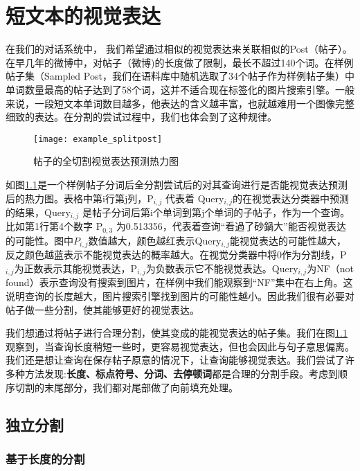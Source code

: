 \chapter{短文本的视觉表达}

在我们的对话系统中，\cite{goldberg2014word2vec} 我们希望通过相似的视觉表达来关联相似的Post（帖子）。在早几年的微博中，对帖子（微博)的长度做了限制，最长不超过140个词。在样例帖子集（Sampled Post，我们在语料库中随机选取了34个帖子作为样例帖子集）中单词数量最高的帖子达到了58个词，这并不适合现在标签化的图片搜索引擎。一般来说，一段短文本单词数目越多，他表达的含义越丰富，也就越难用一个图像完整细致的表达。在分割的尝试过程中，我们也体会到了这种规律。

\begin{figure}[ht]
\centering
\texttt{[image: example\_splitpost]}
\caption{帖子的全切割视觉表达预测热力图} \label{fig:example_splitpost}
\end{figure}

如图\ref{fig:example_splitpost}是一个样例帖子分词后全分割尝试后的对其查询进行是否能视觉表达预测后的热力图。表格中第i行第j列，P$_{i,j}$ 代表着 Query$_{i,j}$的在视觉表达分类器中预测的结果，Query$_{i,j}$ 是帖子分词后第i个单词到第j个单词的子帖子，作为一个查询。比如第1行第4个数字 P$_{0,3}$ 为0.513356，代表着查询“看過了砂鍋大”能否视觉表达的可能性。图中$P_{i,j}$数值越大，颜色越红表示Query$_{i,j}$能视觉表达的可能性越大，反之颜色越蓝表示不能视觉表达的概率越大。在视觉分类器中将0作为分割线，P$_{i,j}$为正数表示其能视觉表达，P$_{i,j}$为负数表示它不能视觉表达。Query$_{i,j}$为NF（not found）表示查询没有搜索到图片，在样例中我们能观察到“NF”集中在右上角。这说明查询的长度越大，图片搜索引擎找到图片的可能性越小。因此我们很有必要对帖子做一些分割，使其能够更好的视觉表达。

我们想通过将帖子进行合理分割，使其变成的能视觉表达的帖子集。我们在图\ref{fig:example_splitpost}观察到，当查询长度稍短一些时，更容易视觉表达，但也会因此与句子意思偏离。我们还是想让查询在保存帖子原意的情况下，让查询能够视觉表达。我们尝试了许多种方法发现:\textbf{长度、标点符号、分词、去停顿词}都是合理的分割手段。考虑到顺序切割的末尾部分，我们都对尾部做了向前填充处理。

\section{独立分割}

\subsection{基于长度的分割}

